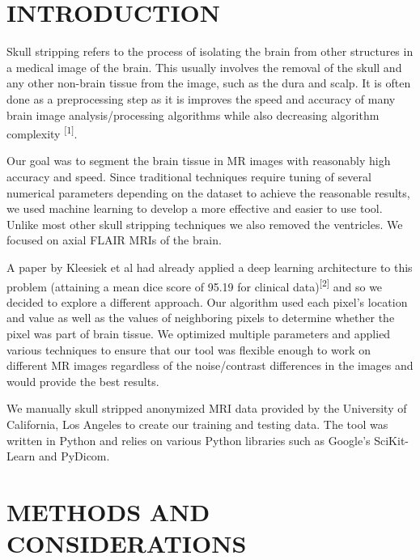 \documentclass[letterpaper, 10 pt, conference]{ieeeconf}
\begin{document}
\section{INTRODUCTION}
Skull stripping refers to the process of isolating the brain from other structures in a medical image of the brain. This usually involves the removal of the skull and any other non-brain tissue from the image, such as the dura and scalp. It is often done as a preprocessing step as it is improves the speed and accuracy of many brain image analysis/processing algorithms while also decreasing algorithm complexity \textsuperscript{[1]}. \par
Our goal was to segment the brain tissue in MR images with reasonably high accuracy and speed. Since traditional techniques require tuning of several numerical parameters depending on the dataset to achieve the reasonable results, we used machine learning to develop a more effective and easier to use tool. Unlike most other skull stripping techniques we also removed the ventricles. We focused on axial FLAIR MRIs of the brain. \par
A paper by Kleesiek et al had already applied a deep learning architecture to this problem (attaining a mean dice score of 95.19 for clinical data)\textsuperscript{[2]} and so we decided to explore a different approach. Our algorithm used each pixel's location and value as well as the values of neighboring pixels to determine whether the pixel was part of brain tissue. We optimized multiple parameters and applied various techniques to ensure that our tool was flexible enough to work on different MR images regardless of the noise/contrast differences in the images and would provide the best results. \par
We manually skull stripped anonymized MRI data provided by the University of California, Los Angeles to create our training and testing data. The tool was written in Python and relies on various Python libraries such as Google's SciKit-Learn and PyDicom.

\section{METHODS AND CONSIDERATIONS}
\end{document}
